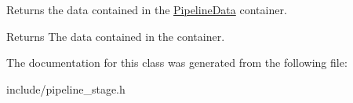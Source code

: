 Returns the data contained in the \hyperlink{class_blade_1_1_pipeline_data}{Pipeline\+Data} container. 

\begin{DoxyReturn}{Returns}
The data contained in the container. 
\end{DoxyReturn}


The documentation for this class was generated from the following file\+:\begin{DoxyCompactItemize}
\item 
include/pipeline\+\_\+stage.\+h\end{DoxyCompactItemize}
